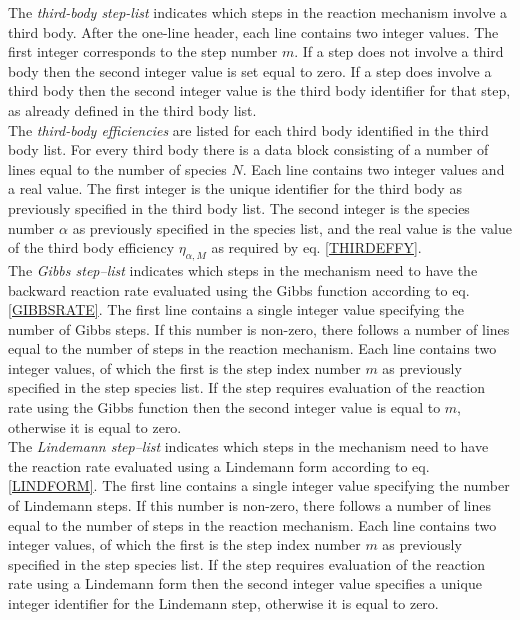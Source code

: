 \documentclass[dvips]{article}
\begin{document}
\noindent
The {\it third-body step-list} indicates which steps in the reaction mechanism
involve a third body.  After the one-line header, each line contains two
integer values.  The first integer corresponds to the step number $m$.
If a step does not involve a third body then the second integer value
is set equal to zero.  If a step does involve a third body then the second
integer value is the third body identifier for that step, as already 
defined in the third body list.\\

\noindent
The {\it third-body efficiencies} are listed for each third body
identified in the third body list.  For every third body there is a data
block consisting of a number of lines equal to the number of
species $N$.  Each line contains two integer values and a real value.
The first integer is the unique identifier for the third body as
previously specified in the third body list.  The second integer is the
species number $\alpha$ as previously specified in the species list, and
the real value is the value of the third body efficiency $\eta_{\alpha,M}$
as required by eq. \ref{THIRDEFFY}.\\

\noindent
The {\it Gibbs step--list} indicates which steps in the mechanism need to
have the backward reaction rate evaluated using the Gibbs function according to
eq. \ref{GIBBSRATE}.  The first line contains a single integer value
specifying the number of Gibbs steps.  If this number is non-zero, there
follows a number of lines equal to the number of steps in the reaction
mechanism.  Each line contains two integer values, of which the first is
the step index number $m$ as previously specified in the step species list.  If
the step requires evaluation of the reaction rate using
the Gibbs function then the second integer value is equal to $m$,
otherwise it is equal to zero.\\

\noindent
The {\it Lindemann step--list} indicates which steps in the mechanism need to
have the reaction rate evaluated using a Lindemann form according to
eq. \ref{LINDFORM}.  The first line contains a single integer value
specifying the number of Lindemann steps.  If this number is non-zero, there
follows a number of lines equal to the number of steps in the reaction
mechanism.  Each line contains two integer values, of which the first is
the step index number $m$ as previously specified in the step species list.  If
the step requires evaluation of the reaction rate using
a Lindemann form then the second integer value specifies a unique
integer identifier for the Lindemann step,
otherwise it is equal to zero.\\
\end{document}
